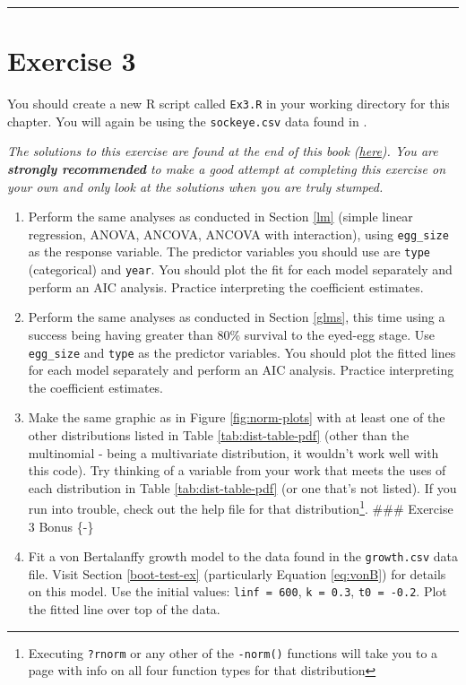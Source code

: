 \documentclass[]{book}
\let\rmarkdownfootnote\footnote%
\def\footnote{\protect\rmarkdownfootnote}
\theoremstyle{definition}
\theoremstyle{definition}
\theoremstyle{definition}
\theoremstyle{remark}
\begin{document}
\begin{center}\rule{0.5\linewidth}{\linethickness}\end{center}

\section*{Exercise 3}\label{exercise-3}

You should create a new R script called \texttt{Ex3.R} in your working
directory for this chapter. You will again be using the
\texttt{sockeye.csv} data found in \citet{sockeye-cite}.

\emph{The solutions to this exercise are found at the end of this book
(\protect\hyperlink{ex3-answers}{here}). You are \textbf{strongly
recommended} to make a good attempt at completing this exercise on your
own and only look at the solutions when you are truly stumped.}

\begin{enumerate}
\def\labelenumi{\arabic{enumi}.}
\item
  Perform the same analyses as conducted in Section \ref{lm} (simple
  linear regression, ANOVA, ANCOVA, ANCOVA with interaction), using
  \texttt{egg\_size} as the response variable. The predictor variables
  you should use are \texttt{type} (categorical) and \texttt{year}. You
  should plot the fit for each model separately and perform an AIC
  analysis. Practice interpreting the coefficient estimates.
\item
  Perform the same analyses as conducted in Section \ref{glms}, this
  time using a success being having greater than 80\% survival to the
  eyed-egg stage. Use \texttt{egg\_size} and \texttt{type} as the
  predictor variables. You should plot the fitted lines for each model
  separately and perform an AIC analysis. Practice interpreting the
  coefficient estimates.
\item
  Make the same graphic as in Figure \ref{fig:norm-plots} with at least
  one of the other distributions listed in Table
  \ref{tab:dist-table-pdf} (other than the multinomial - being a
  multivariate distribution, it wouldn't work well with this code). Try
  thinking of a variable from your work that meets the uses of each
  distribution in Table \ref{tab:dist-table-pdf} (or one that's not
  listed). If you run into trouble, check out the help file for that
  distribution\footnote{Executing \texttt{?rnorm} or any other of the
    \texttt{-norm()} functions will take you to a page with info on all
    four function types for that distribution}. \#\#\# Exercise 3 Bonus
  \{-\}
\item
  Fit a von Bertalanffy growth model to the data found in the
  \texttt{growth.csv} data file. Visit Section \ref{boot-test-ex}
  (particularly Equation \eqref{eq:vonB}) for details on this model. Use
  the initial values: \texttt{linf\ =\ 600}, \texttt{k\ =\ 0.3},
  \texttt{t0\ =\ -0.2}. Plot the fitted line over top of the data.
\end{enumerate}
\end{document}
